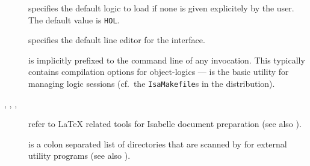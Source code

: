 \begin{isabellebody}
\begin{isamarkuptext}
\begin{description}
  \item[\hypertarget{setting.ISABELLE-LOGIC}{\hyperlink{setting.ISABELLE-LOGIC}{\mbox{}}}] specifies the default logic to
  load if none is given explicitely by the user.  The default value is
  \verb|HOL|.
  
  \item[\hypertarget{setting.ISABELLE-LINE-EDITOR}{\hyperlink{setting.ISABELLE-LINE-EDITOR}{\mbox{}}}] specifies the default
  line editor for the \hyperlink{tool.tty}{\mbox{}} interface.

  \item[\hypertarget{setting.ISABELLE-USEDIR-OPTIONS}{\hyperlink{setting.ISABELLE-USEDIR-OPTIONS}{\mbox{}}}] is implicitly prefixed
  to the command line of any \hyperlink{tool.usedir}{\mbox{}} invocation. This
  typically contains compilation options for object-logics --- \hyperlink{tool.usedir}{\mbox{}} is the basic utility for managing logic sessions (cf.\ the
  \verb|IsaMakefile|s in the distribution).

  \item[\hypertarget{setting.ISABELLE-LATEX}{\hyperlink{setting.ISABELLE-LATEX}{\mbox{}}}, \hypertarget{setting.ISABELLE-PDFLATEX}{\hyperlink{setting.ISABELLE-PDFLATEX}{\mbox{}}}, \hypertarget{setting.ISABELLE-BIBTEX}{\hyperlink{setting.ISABELLE-BIBTEX}{\mbox{}}}, \hypertarget{setting.ISABELLE-DVIPS}{\hyperlink{setting.ISABELLE-DVIPS}{\mbox{}}}] refer to {\LaTeX} related tools for Isabelle
  document preparation (see also ).
  
  \item[\hypertarget{setting.ISABELLE-TOOLS}{\hyperlink{setting.ISABELLE-TOOLS}{\mbox{}}}] is a colon separated list of
  directories that are scanned by \hyperlink{executable.isabelle}{\mbox{}} for external
  utility programs (see also ).
  

\end{description}
\end{isamarkuptext}
\end{isabellebody}
